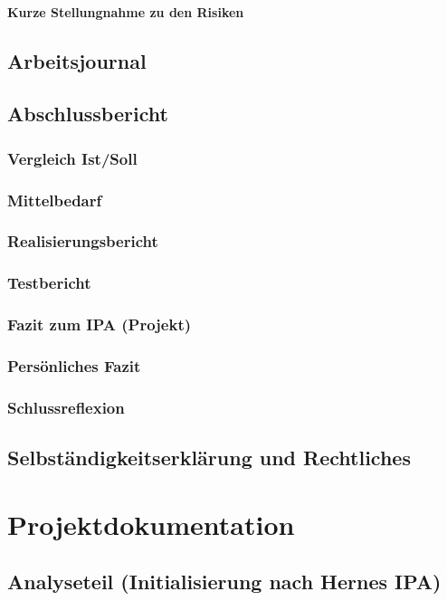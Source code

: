 \documentclass{report}
\begin{document}
\subsection{Kurze Stellungnahme zu den Risiken}

\chapter{Arbeitsjournal}

\chapter{Abschlussbericht}
\section{Vergleich Ist/Soll}
\section{Mittelbedarf}
\section{Realisierungsbericht}
\section{Testbericht}
\section{Fazit zum IPA (Projekt)}
\section{Persönliches Fazit}
\section{Schlussreflexion}

\chapter{Selbständigkeitserklärung und Rechtliches}

\part{Projektdokumentation}

\chapter{Analyseteil (Initialisierung nach Hernes IPA)}
\end{document}

